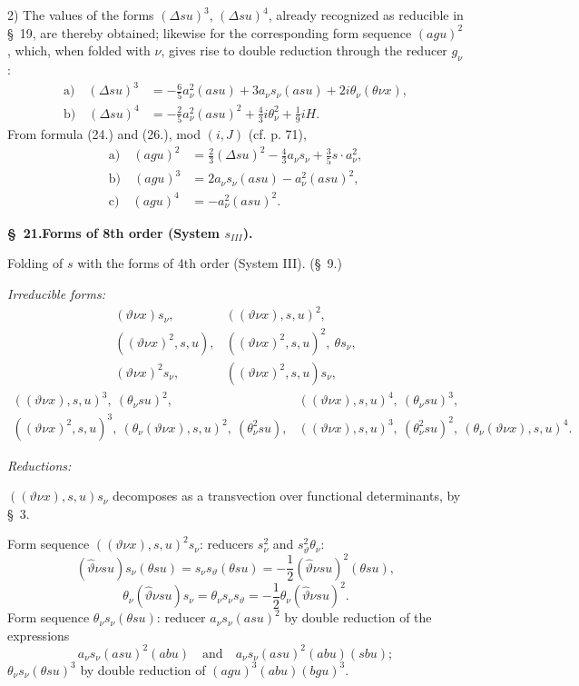 \documentclass[11pt]{article}
\newcommand{\A}{\Delta}
\begin{document}
2) The values of the forms $(\A su)^3$, $(\A su)^4$, already recognized as reducible in \S\ 19, are thereby obtained; likewise for the corresponding form sequence $(agu)^2$, which, when folded with $\nu$, gives rise to double reduction through the reducer $g_\nu$:
\[
\tag{26}
\begin{aligned}
\text{a)}\quad (\A su)^3&=-\frac65a_\nu^2(asu)+3a_\nu s_\nu(asu)+2i\theta_\nu(\theta\nu x),\\
\text{b)}\quad (\A su)^4&=-\frac25a_\nu^2(asu)^2+\frac43i\theta_\nu^2+\frac19iH.
\end{aligned}
\]
From formula (24.) and (26.), mod $(i,J)$ (cf. p. 71),
\[
\tag{27}
\begin{aligned}
\text{a)}\quad (agu)^2&=\frac23(\A su)^2-\frac43a_\nu s_\nu+\frac35s\cdot a_\nu^2,\\
\text{b)}\quad (agu)^3&=2a_\nu s_\nu(asu)-a_\nu^2(asu)^2,\\
\text{c)}\quad (agu)^4&=-a_\nu^2(asu)^2.
\end{aligned}
\]


\begin{center}
\textbf{\S\ 21.\quad Forms of 8th order (System $s_{III}$).}
\end{center}

Folding of $s$ with the forms of 4th order (System III). (\S\ 9.)

\noindent\emph{Irreducible forms:}
\[
\begin{array}{lll}
(\vartheta\nu x)s_\nu,& ((\vartheta\nu x),s,u)^2,\\[-0.1em]
((\vartheta\nu x)^2,s,u),& ((\vartheta\nu x)^2,s,u)^2,\ \theta s_\nu,\\[-0.1em]
(\vartheta\nu x)^2s_\nu,& ((\vartheta\nu x)^2,s,u)s_\nu,
\end{array}
\]
\[
\begin{array}{lll}
((\vartheta\nu x),s,u)^3,\ (\theta_\nu su)^2,&
((\vartheta\nu x),s,u)^4,\ (\theta_\nu su)^3,\\[-0.1em]
((\vartheta\nu x)^2,s,u)^3,\ (\theta_\nu(\vartheta\nu x),s,u)^2,\ (\theta_\nu^2su),&
((\vartheta\nu x),s,u)^3,\ (\theta_\nu^2su)^2,\ (\theta_\nu(\vartheta\nu x),s,u)^4.
\end{array}
\]

\noindent\emph{Reductions:}

$((\vartheta\nu x),s,u)s_\nu$ decomposes as a transvection over functional determinants, by \S\ 3.

Form sequence $((\vartheta\nu x),s,u)^2s_\nu$: reducers $s_\nu^2$ and $s_\vartheta^2\theta_\nu$:
\[
(\widehat\vartheta\nu su)s_\nu(\theta su)=s_\nu s_\vartheta(\theta su)=-\frac12(\widehat\vartheta\nu su)^2(\theta su),
\]
\[
\theta_\nu(\widehat\vartheta\nu su)s_\nu=\theta_\nu s_\nu s_\vartheta=-\frac12\theta_\nu(\widehat\vartheta\nu su)^2.
\]
Form sequence $\theta_\nu s_\nu(\theta su)$: reducer $a_\nu s_\nu(asu)^2$ by double reduction of the expressions
\[
a_\nu s_\nu(asu)^2(abu)\quad\text{and}\quad a_\nu s_\nu(asu)^2(abu)(sbu);
\]
$\theta_\nu s_\nu(\theta su)^3$ by double reduction of $(agu)^3(abu)(bgu)^3$.
\end{document}
